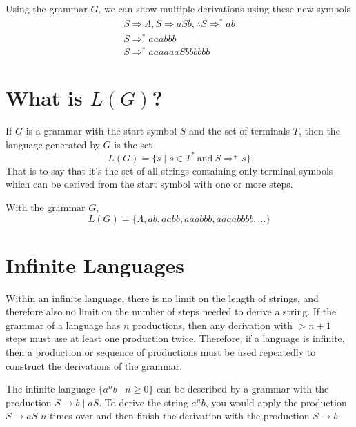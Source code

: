 \begin{example*}{}{}
  Using the grammar $G$, we can show multiple derivations using these new symbols
  \begin{gather*}
    S \Rightarrow \Lambda, S \Rightarrow aSb, \therefore S \Rightarrow^* ab\\
    S \Rightarrow^* aaabbb\\
    S \Rightarrow^* aaaaaaSbbbbbb
  \end{gather*}
\end{example*}

\section*{What is $L(G)$?}

\begin{definition*}{}{}
  If $G$ is a grammar with the start symbol $S$ and the set of terminals $T$, then the language generated by $G$ is
   the set
  \begin{equation*}
    L(G) = \{s \mid s \in T^* \mathrm{\ and\ } S \Rightarrow^+ s\}
  \end{equation*}
  That is to say that it's the set of all strings containing only terminal symbols which can be derived from the start
   symbol with one or more steps.
\end{definition*}

\begin{example*}{}{}
  With the grammar $G$,
  \begin{equation*}
    L(G) = \{\Lambda, ab, aabb, aaabbb, aaaabbbb, \ldots\}
  \end{equation*}
\end{example*}

\section*{Infinite Languages}

Within an infinite language, there is no limit on the length of strings, and therefore also no limit on the number of
 steps needed to derive a string. If the grammar of a language has $n$ productions, then any derivation with $> n + 1$
 steps must use at least one production twice. Therefore, if a language is infinite, then a production or sequence of
 productions must be used repeatedly to construct the derivations of the grammar.

\begin{example*}{}{}
  The infinite language $\{a^n b \mid n \geq 0\}$ can be described by a grammar with the production $S \rightarrow b \mid aS$.
   To derive the string $a^n b$, you would apply the production $S \rightarrow aS$ $n$ times over and then finish the
   derivation with the production $S \rightarrow b$.
\end{example*}

